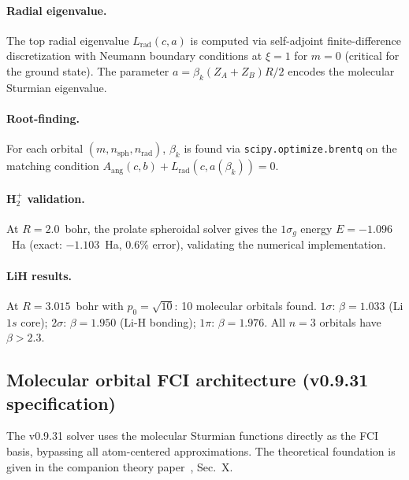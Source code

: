 \documentclass[aps,pra,twocolumn,superscriptaddress,longbibliography,floatfix]{revtex4-2}
\begin{document}
\paragraph{Radial eigenvalue.}
The top radial eigenvalue $L_{\text{rad}}(c, a)$ is computed via
self-adjoint finite-difference discretization with Neumann boundary
conditions at $\xi = 1$ for $m = 0$ (critical for the ground state).
The parameter $a = \beta_k (Z_A + Z_B) R / 2$ encodes the molecular
Sturmian eigenvalue.

\paragraph{Root-finding.}
For each orbital $(m, n_{\text{sph}}, n_{\text{rad}})$, $\beta_k$ is
found via \texttt{scipy.optimize.brentq} on the matching condition
$A_{\text{ang}}(c, b) + L_{\text{rad}}(c, a(\beta_k)) = 0$.

\paragraph{H$_2^+$ validation.}
At $R = 2.0$~bohr, the prolate spheroidal solver gives the $1\sigma_g$
energy $E = -1.096$~Ha (exact: $-1.103$~Ha, 0.6\% error), validating
the numerical implementation.

\paragraph{LiH results.}
At $R = 3.015$~bohr with $p_0 = \sqrt{10}$: 10 molecular orbitals
found.  $1\sigma$: $\beta = 1.033$ (Li $1s$ core);
$2\sigma$: $\beta = 1.950$ (Li-H bonding);
$1\pi$: $\beta = 1.976$.  All $n=3$ orbitals have $\beta > 2.3$.


\subsection{Molecular orbital FCI architecture (v0.9.31 specification)}
\label{sec:mo_fci_spec}

The v0.9.31 solver uses the molecular Sturmian functions directly as
the FCI basis, bypassing all atom-centered approximations.  The
theoretical foundation is given in the companion theory
paper~\cite{loutey_bond_sphere_sturmian}, Sec.~X.
\end{document}
